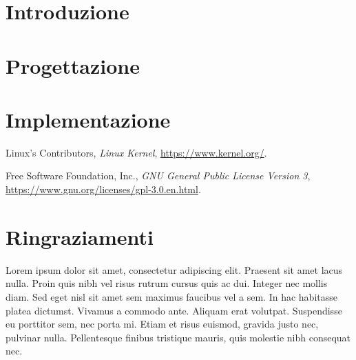 \documentclass[12pt,a4paper,openright,twoside]{report}
\begin{document}
\clearpage{\pagestyle{empty}\cleardoublepage}
\tableofcontents
{}
\listoffigures
\clearpage{\pagestyle{empty}\cleardoublepage}
\listoftables
\clearpage{\pagestyle{empty}\cleardoublepage}

\clearpage{\pagestyle{empty}\cleardoublepage}

\chapter{Introduzione}
\lhead[\fancyplain{}{\bfseries\thepage}]{\fancyplain{}{\bfseries\rightmark}}


\chapter{Progettazione}
\lhead[\fancyplain{}{\bfseries\thepage}]{\fancyplain{}{\bfseries\rightmark}}


\chapter{Implementazione}
\lhead[\fancyplain{}{\bfseries\thepage}]{\fancyplain{}{\bfseries\rightmark}}


\begin{thebibliography}{99}
	Linux's Contributors,
	\textit{Linux Kernel},
	\url{https://www.kernel.org/}.

	Free Software Foundation, Inc.,
	\textit{GNU General Public License Version 3},
	\url{https://www.gnu.org/licenses/gpl-3.0.en.html}.

\end{thebibliography}

\chapter*{Ringraziamenti}
Lorem ipsum dolor sit amet, consectetur adipiscing elit. Praesent sit amet lacus nulla. Proin quis nibh vel risus rutrum cursus quis ac dui. Integer nec mollis diam. Sed eget nisl sit amet sem maximus faucibus vel a sem. In hac habitasse platea dictumst. Vivamus a commodo ante. Aliquam erat volutpat. Suspendisse eu porttitor sem, nec porta mi. Etiam et risus euismod, gravida justo nec, pulvinar nulla. Pellentesque finibus tristique mauris, quis molestie nibh consequat nec.
\end{document}
